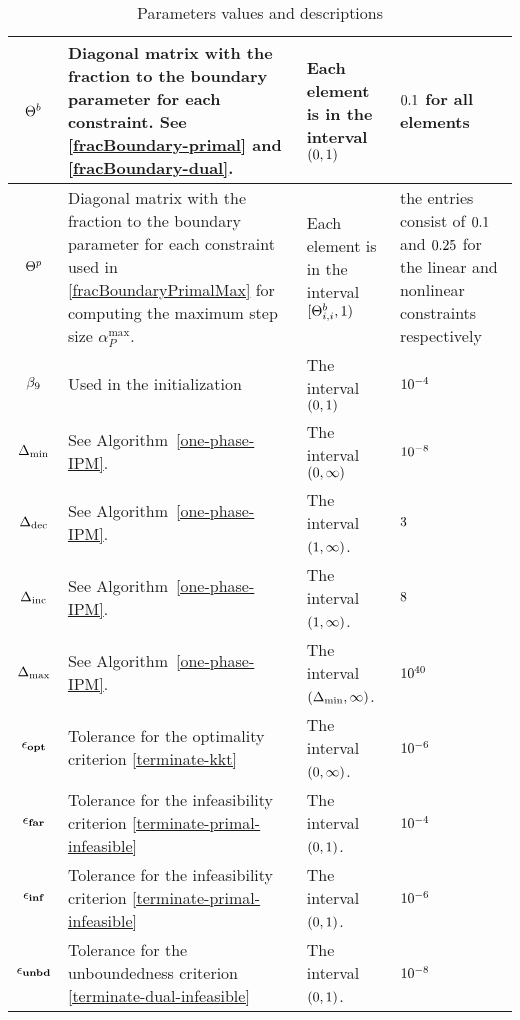 \documentclass{article}
\begin{document}
\begin{table}[H]
\begin{tabular}{ |c| p{7cm}|p{4.0cm}| p{3cm}| }
\hline
 $\Theta^{b}$ & Diagonal matrix with the fraction to the boundary parameter for each constraint. See \eqref{fracBoundary-primal} and \eqref{fracBoundary-dual}. & Each element is in the interval $(0,1)$ & $0.1$ for all elements \\ 
        \hline
$\Theta^{p}$ & Diagonal matrix with the fraction to the boundary parameter for each constraint used in \eqref{fracBoundaryPrimalMax} for computing the maximum step size $\alpha_{P}^{\max}$. & Each element is in the interval $[\Theta^{b}_{i,i}, 1)$ & the entries consist of $0.1$ and $0.25$ for the linear and nonlinear constraints respectively \\
\hline
$\beta_{9}$  & Used in the initialization & The interval $(0,1)$ & $10^{-4}$ \\
\hline
$\Delta_{\min}$ & See Algorithm~\ref{one-phase-IPM}.  & The interval $(0,\infty)$ & $10^{-8}$ \\
\hline
$\Delta_{\text{dec}}$ & See Algorithm~\ref{one-phase-IPM}. &The interval $(1,\infty)$. & $3$ \\
\hline
$\Delta_{\text{inc}}$ & See Algorithm~\ref{one-phase-IPM}. &The interval $(1,\infty)$. & $8$ \\
\hline
$\Delta_{\max}$ & See Algorithm~\ref{one-phase-IPM}. &The interval $(\Delta_{\min},\infty)$. & $10^{40}$ \\
\hline
$\epsilon_{\textbf{opt}}$ & Tolerance for the optimality criterion \eqref{terminate-kkt} & The interval $(0,\infty)$. & $10^{-6}$  \\
\hline
$\epsilon_{\textbf{far}}$ & Tolerance for the infeasibility criterion \eqref{terminate-primal-infeasible} & The interval $(0,1)$. & $10^{-4}$ \\
\hline
$\epsilon_{\textbf{inf}}$ & Tolerance for the infeasibility criterion \eqref{terminate-primal-infeasible} & The interval $(0,1)$. & $10^{-6}$ \\
\hline
$\epsilon_{\textbf{unbd}}$ & Tolerance for the unboundedness criterion \eqref{terminate-dual-infeasible} & The interval $(0,1)$. & $10^{-8}$ \\
\hline
\end{tabular}
\caption{Parameters values and descriptions}
\end{table}
\end{document}
